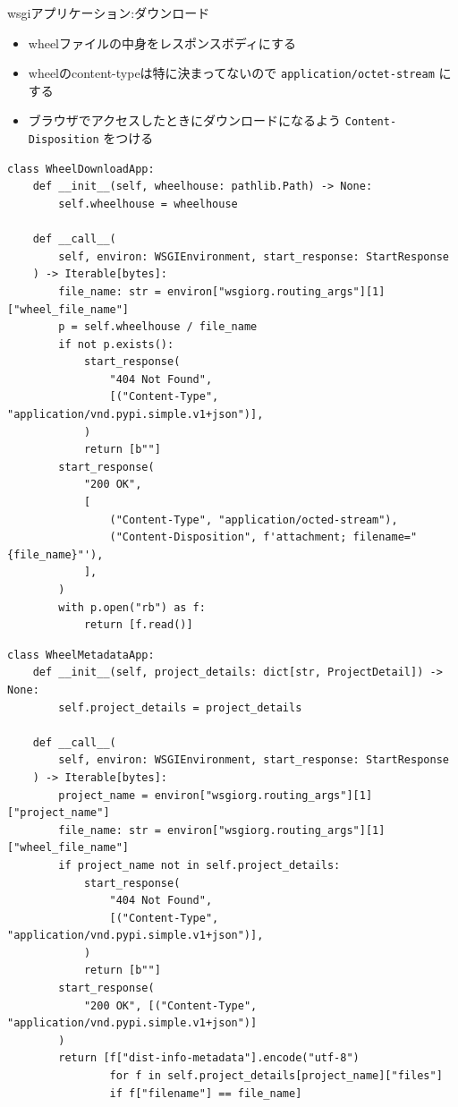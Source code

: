 \documentclass[presentation]{beamer}
\begin{document}
\begin{frame}[label={sec:org610f531},fragile]{wsgiアプリケーション:ダウンロード}
 \begin{itemize}
\item wheelファイルの中身をレスポンスボディにする
\item wheelのcontent-typeは特に決まってないので \texttt{application/octet-stream} にする
\item ブラウザでアクセスしたときにダウンロードになるよう \texttt{Content-Disposition} をつける
\end{itemize}

\begin{verbatim}
class WheelDownloadApp:
    def __init__(self, wheelhouse: pathlib.Path) -> None:
        self.wheelhouse = wheelhouse

    def __call__(
        self, environ: WSGIEnvironment, start_response: StartResponse
    ) -> Iterable[bytes]:
        file_name: str = environ["wsgiorg.routing_args"][1]["wheel_file_name"]
        p = self.wheelhouse / file_name
        if not p.exists():
            start_response(
                "404 Not Found",
                [("Content-Type", "application/vnd.pypi.simple.v1+json")],
            )
            return [b""]
        start_response(
            "200 OK",
            [
                ("Content-Type", "application/octed-stream"),
                ("Content-Disposition", f'attachment; filename="{file_name}"'),
            ],
        )
        with p.open("rb") as f:
            return [f.read()]

\end{verbatim}

\begin{verbatim}
class WheelMetadataApp:
    def __init__(self, project_details: dict[str, ProjectDetail]) -> None:
        self.project_details = project_details

    def __call__(
        self, environ: WSGIEnvironment, start_response: StartResponse
    ) -> Iterable[bytes]:
        project_name = environ["wsgiorg.routing_args"][1]["project_name"]
        file_name: str = environ["wsgiorg.routing_args"][1]["wheel_file_name"]
        if project_name not in self.project_details:
            start_response(
                "404 Not Found",
                [("Content-Type", "application/vnd.pypi.simple.v1+json")],
            )
            return [b""]
        start_response(
            "200 OK", [("Content-Type", "application/vnd.pypi.simple.v1+json")]
        )
        return [f["dist-info-metadata"].encode("utf-8")
                for f in self.project_details[project_name]["files"]
                if f["filename"] == file_name]

\end{verbatim}
\end{frame}
\end{document}
